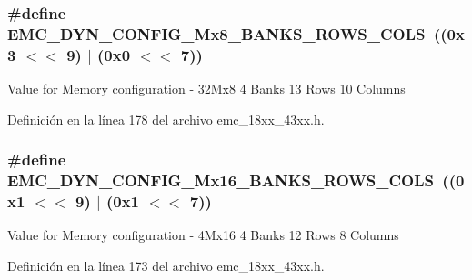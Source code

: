 \subsubsection[{\texorpdfstring{E\+M\+C\+\_\+\+D\+Y\+N\+\_\+\+C\+O\+N\+F\+I\+G\+\_\+32\+Mx8\+\_\+4\+B\+A\+N\+K\+S\+\_\+13\+R\+O\+W\+S\+\_\+10\+C\+O\+LS}{EMC_DYN_CONFIG_32Mx8_4BANKS_13ROWS_10COLS}}]{\setlength{\rightskip}{0pt plus 5cm}\#define E\+M\+C\+\_\+\+D\+Y\+N\+\_\+\+C\+O\+N\+F\+I\+G\+\_\+Mx8\+\_\+B\+A\+N\+K\+S\+\_\+R\+O\+W\+S\+\_\+C\+O\+LS~((0x3 $<$$<$ 9) $\vert$ (0x0 $<$$<$ 7))}\hypertarget{group___e_m_c__18_x_x__43_x_x_gad29d5c194da507127869af2709e3da65}{}\label{group___e_m_c__18_x_x__43_x_x_gad29d5c194da507127869af2709e3da65}
Value for Memory configuration -\/ 32\+Mx8 4 Banks 13 Rows 10 Columns 

Definición en la línea 178 del archivo emc\+\_\+18xx\+\_\+43xx.\+h.

\subsubsection[{\texorpdfstring{E\+M\+C\+\_\+\+D\+Y\+N\+\_\+\+C\+O\+N\+F\+I\+G\+\_\+4\+Mx16\+\_\+4\+B\+A\+N\+K\+S\+\_\+12\+R\+O\+W\+S\+\_\+8\+C\+O\+LS}{EMC_DYN_CONFIG_4Mx16_4BANKS_12ROWS_8COLS}}]{\setlength{\rightskip}{0pt plus 5cm}\#define E\+M\+C\+\_\+\+D\+Y\+N\+\_\+\+C\+O\+N\+F\+I\+G\+\_\+Mx16\+\_\+B\+A\+N\+K\+S\+\_\+R\+O\+W\+S\+\_\+C\+O\+LS~((0x1 $<$$<$ 9) $\vert$ (0x1 $<$$<$ 7))}\hypertarget{group___e_m_c__18_x_x__43_x_x_gaaae5ad67c8ceb5166c9984243396fa2d}{}\label{group___e_m_c__18_x_x__43_x_x_gaaae5ad67c8ceb5166c9984243396fa2d}
Value for Memory configuration -\/ 4\+Mx16 4 Banks 12 Rows 8 Columns 

Definición en la línea 173 del archivo emc\+\_\+18xx\+\_\+43xx.\+h.

